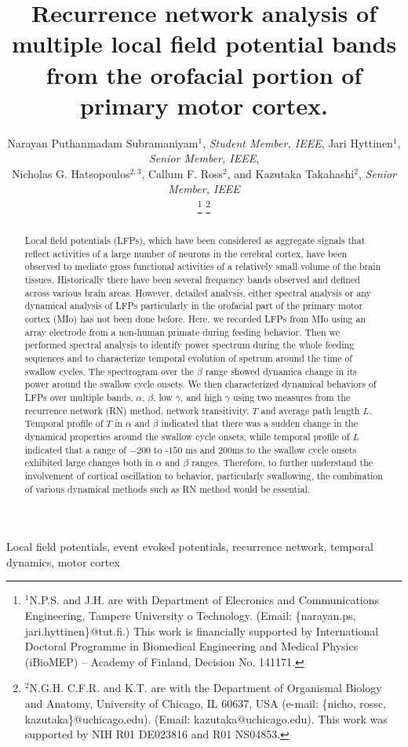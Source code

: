\documentclass[letterpaper, 9pt, conference]{ieeeconf}
\title{\LARGE \bf
Recurrence network analysis of multiple local field potential bands from the orofacial portion of primary motor cortex. 
}
\author{Narayan Puthanmadam Subramaniyam$^{1}$, {\em Student Member, IEEE}, Jari Hyttinen$^{1}$, {\em Senior Member, IEEE}, \\
Nicholas G. Hatsopoulos$^{2,3}$, Callum F. Ross$^{2}$, and 
Kazutaka Takahashi$^{2}$, {\em Senior Member, IEEE} \\
\thanks{$^{1}$N.P.S. and J.H. are with Department of Elecronics and Communications Engineering, Tampere University o Technology. 
(Email: \{narayan.ps, jari.hyttinen\}@tut.fi.) This work is ﬁnancially supported by International Doctoral Programme in Biomedical Engineering and Medical Physics (iBioMEP) – Academy of Finland, Decision No. 141171.}
\thanks{$^{2}$N.G.H. C.F.R. and K.T. are with the Department of Organismal Biology and Anatomy, University of Chicago, IL 60637, USA (e-mail: \{nicho, rossc, kazutaka\}@uchicago.edu). 
 (Email: kazutaka@uchicago.edu). This work was supported by NIH R01 DE023816
and R01 NS04853.
}
}
\begin{document}
\maketitle
\thispagestyle{empty}
\pagestyle{empty}


\begin{abstract}
Local field potentials (LFPs), which have been considered as aggregate signals that reflect activities of a large number of neurons in the cerebral cortex, have been observed to mediate gross functional activities of a relatively small volume of the brain tissues. Historically there have been several frequency bands observed and defined across various brain areas. However, detailed analysis, either spectral analysis or any dynamical analysis of LFPs particularly in the orofacial part of the primary motor cortex (MIo) has not been done before. Here, we recorded LFPs from MIo using an array electrode from a non-human primate during feeding behavior. Then we performed spectral analysis to identify power spectrum during the whole feeding sequences and to characterize temporal evolution of spetrum around the time of swallow cycles. The spectrogram over the $\beta$ range showed dynamica change in its power around the swallow cycle onsets. We then characterized dynamical behaviors of LFPs over multiple bands, $\alpha$, $\beta$, low $\gamma$, and high $\gamma$ using two measures from  the recurrence network (RN) method, network transitivity, $T$ and average path length $L$. Temporal profile of $T$ in $\alpha$ and $\beta$ indicated that there was a sudden change in the dynamical properties around the swallow cycle onsets, while temporal profile of $L$ indicated that a range of $-200$ to -$150$ ms and $200$ms to the swallow cycle onsets exhibited large changes both in $\alpha$ and $\beta$ ranges. Therefore, to further understand the involvement of cortical oscillation to behavior, particularly swallowing, the combination of various dynamical methods such as RN method would be essential. 

\end{abstract}

\begin{keywords}
Local field potentials, event evoked potentials, recurrence network, temporal dynamics, motor cortex
\end{keywords}
\end{document}
